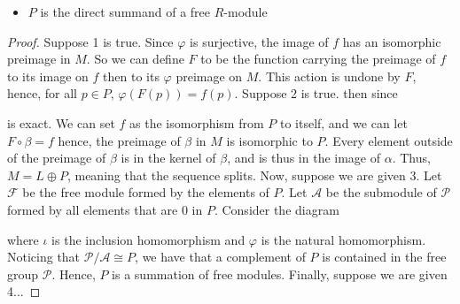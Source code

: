 \documentclass[10pt]{article}
\newenvironment{theorem}[2][Theorem]{\begin{trivlist}
		\item[\hskip \labelsep {\bfseries #1}\hskip \labelsep {\bfseries #2.}]}{\end{trivlist}}
\begin{document}
\begin{theorem}{30}
\begin{itemize}
			\item[\textbf{(4)}]
			$P$ is the direct summand of a free $R$-module
		\end{itemize}
		\begin{proof}
			Suppose 1 is true. Since $\varphi$ is surjective, the image of $f$ has an isomorphic preimage in $M$. So we can define $F$ to be the function carrying the preimage of $f$ to its image on $f$ then to its $\varphi$ preimage on $M$. This action is undone by $F$, hence, for all $p \in P$, $\varphi(F(p)) = f(p)$. Suppose 2 is true. then since 
			is exact. We can set $f$ as the isomorphism from $P$ to itself, and we can let $F \circ \beta = f$ hence, the preimage of $\beta$ in $M$ is isomorphic to $P$. Every element outside of the preimage of $\beta$ is in the kernel of $\beta$, and is thus in the image of $\alpha$. Thus, $M = L \oplus P$, meaning that the sequence splits. Now, suppose we are given 3. Let $\mathcal{F}$ be the free module formed by the elements of $P$. Let $\mathcal{A}$ be the submodule of $\mathcal{P}$ formed by all elements that are $0$ in $P$. Consider the diagram
			where $\iota$ is the inclusion homomorphism and $\varphi$ is the natural homomorphism. Noticing that $\mathcal{P}/\mathcal{A} \cong P$, we have that a complement of $P$ is contained in the free group $\mathcal{P}$. Hence, $P$ is a summation of free modules. Finally, suppose we are given 4...
		\end{proof}
	\end{theorem}
	
\end{document}
